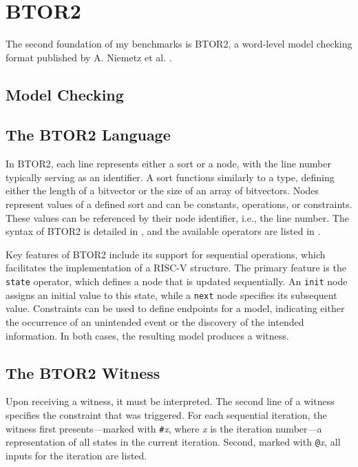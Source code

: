 \chapter{BTOR2}\label{chap:btor2}

The second foundation of my benchmarks is BTOR2, a word-level model
checking format published by A. Niemetz et al. \cite{btor2}.

\section{Model Checking}
 

\section{The BTOR2 Language}
In BTOR2, each line represents either a sort or a node, with the line
number typically serving as an identifier. A sort functions similarly
to a type, defining either the length of a bitvector or the size of
an array of bitvectors. Nodes represent values of a defined sort and
can be constants, operations, or constraints. These values can be
referenced by their node identifier, i.e., the line number. The
syntax of BTOR2 is detailed in \cite[Figure 1]{btor2}, and the
available operators are listed in \cite[Table 1]{btor2}.

Key features of BTOR2 include its support for sequential operations,
which facilitates the implementation of a RISC-V structure. The
primary feature is the \texttt{state} operator, which defines a node
that is updated sequentially. An \texttt{init} node assigns an
initial value to this state, while a \texttt{next} node specifies its
subsequent value. Constraints can be used to define endpoints for a
model, indicating either the occurrence of an unintended event or the
discovery of the intended information. In both cases, the resulting
model produces a witness.

\section{The BTOR2 Witness}\label{witness}
Upon receiving a witness, it must be interpreted. The second line of
a witness specifies the constraint that was triggered. For each
sequential iteration, the witness first presents—marked with
\texttt{\#}\textit{x}, where \textit{x} is the iteration number—a
representation of all states in the current iteration. Second, marked
with \texttt{@}\textit{x}, all inputs for the iteration are listed.

